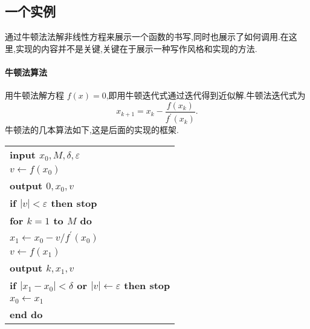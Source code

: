 

\subsection{一个实例}
通过牛顿法法解非线性方程来展示一个函数的书写,同时也展示了如何调用.在这
里,实现的内容并不是关键,关键在于展示一种写作风格和实现的方法.

\paragraph{牛顿法算法}
用牛顿法解方程 \(f(x) = 0\),即用牛顿迭代式通过迭代得到近似解.牛顿法迭代式为
\[
    x_{k+1} = x_k - \frac{f(x_k)}{f^{\prime}(x_k)}.
\]
牛顿法的几本算法如下,这是后面的实现的框架.      
\begin{center}
\begin{supertabular}{l}
        \hline
        \bf{input} \(x_0,M,\delta,\varepsilon \) \\
        \(v\leftarrow f(x_0)\) \\
        \bf{output} \(0,x_0,v\) \\
        \bf{if} \(|v|<\varepsilon\) \bf{then stop} \\
        \bf{for} \(k=1\) \bf{to} \(M\) \bf{do} \\
        \qquad \(x_1\leftarrow x_0-v/f^{\prime}(x_0)\) \\
        \qquad \(v\leftarrow f(x_1)\) \\
        \qquad \bf{output} \(k,x_1,v\) \\
        \qquad \bf{if} \(|x_1-x_0|<\delta \) \bf{or} \(|v|\leftarrow \varepsilon\) \bf{then stop} \\
        \qquad \(x_0\leftarrow x_1\) \\
        \bf{end do} \\
        \hline
\end{supertabular}
\end{center}

